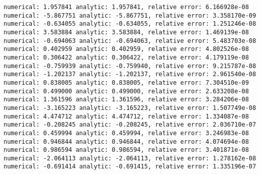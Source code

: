 \documentclass[11pt]{article}
\begin{document}
    \begin{Verbatim}[commandchars=\\\{\}]
numerical: 1.957841 analytic: 1.957841, relative error: 6.166928e-08
numerical: -5.867751 analytic: -5.867751, relative error: 3.358170e-09
numerical: -0.634055 analytic: -0.634055, relative error: 1.251246e-08
numerical: 3.583884 analytic: 3.583884, relative error: 1.469139e-08
numerical: -0.694063 analytic: -0.694063, relative error: 5.483703e-08
numerical: 0.402959 analytic: 0.402959, relative error: 4.802526e-08
numerical: 0.306422 analytic: 0.306422, relative error: 4.179119e-08
numerical: -0.759939 analytic: -0.759940, relative error: 9.215787e-08
numerical: -1.202137 analytic: -1.202137, relative error: 2.961540e-08
numerical: 0.838005 analytic: 0.838005, relative error: 7.304510e-09
numerical: 0.499000 analytic: 0.499000, relative error: 2.633208e-08
numerical: 1.361596 analytic: 1.361596, relative error: 3.284206e-08
numerical: -3.165223 analytic: -3.165223, relative error: 1.507749e-08
numerical: 4.474712 analytic: 4.474712, relative error: 1.334087e-08
numerical: -0.208245 analytic: -0.208245, relative error: 2.036710e-07
numerical: 0.459994 analytic: 0.459994, relative error: 3.246983e-08
numerical: 0.946844 analytic: 0.946844, relative error: 4.074694e-08
numerical: 0.986594 analytic: 0.986594, relative error: 3.401871e-08
numerical: -2.064113 analytic: -2.064113, relative error: 1.278162e-08
numerical: -0.691414 analytic: -0.691415, relative error: 1.335196e-07
    \end{Verbatim}
\end{document}
